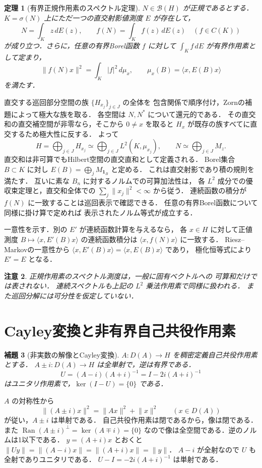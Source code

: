 \documentclass[a5paper,10pt,onecolumn]{jsarticle}
\makeatletter
\theoremstyle{mathnotetheorem}
\newtheorem{theorem}{定理}[section]
\newtheorem{lemma}[theorem]{補題}
\newtheorem{remark}[theorem]{注意}
\renewcommand{\proofname}{証明}
\renewenvironment{proof}[1][\proofname]{%
  \par\pushQED{\qed}\normalfont\topsep4\p@\@plus2\p@\relax
  \trivlist\item[\hskip\labelsep\bfseries #1]\ignorespaces
}{\popQED\endtrivlist\@endpefalse}
\newcommand{\norm}[1]{\lVert #1\rVert}
\makeatother
\begin{document}
\begin{theorem}[有界正規作用素のスペクトル定理]
$N\in\mathcal B(H)$ が正規であるとする．
$K=\sigma(N)$ 上にただ一つの直交射影値測度 $E$ が存在して，
\[
 N=\int_K z\,dE(z),\qquad
 f(N)=\int_K f(z)\,dE(z)\quad(f\in C(K))
\]
が成り立つ．さらに，任意の有界Borel函数 $f$ に対して
$\int_Kf\,dE$ が有界作用素として定まり，
\[
 \norm{f(N)x}^2=\int_K|f|^2\,d\mu_x,
 \qquad \mu_x(B)=\langle x,E(B)x\rangle
\]
を満たす．
\end{theorem}
\begin{proof}
直交する巡回部分空間の族 $\{H_{x_j}\}_{j\in J}$ の全体を
包含関係で順序付け，Zornの補題によって極大な族を取る．
各空間は $N,N^*$ について還元的である．
その直交和の直交補空間が非零なら，そこから $0\ne x$ を取ると
$H_x$ が既存の族すべてに直交するため極大性に反する．
よって
\[
 H=\bigoplus_{j\in J}H_{x_j}
   \simeq\bigoplus_{j\in J}L^2(K,\mu_{x_j}),
 \qquad N\simeq\bigoplus_{j\in J}M_z.
\]
直交和は非可算でもHilbert空間の直交直和として定義される．
Borel集合 $B\subset K$ に対し
$E(B)=\bigoplus_j M_{\mathbf1_B}$ と定める．
これは直交射影であり積の規則を満たす．
互いに素な $B_n$ に対するノルムでの可算加法性は，
各 $L^2$ 成分での優収束定理と，直交和全体での
$\sum_j\norm{x_j}^2<\infty$ から従う．
連続函数の積分が $f(N)$ に一致することは巡回表示で確認できる．
任意の有界Borel函数について同様に掛け算で定めれば
表示されたノルム等式が成立する．

一意性を示す．別の $E'$ が連続函数計算を与えるなら，
各 $x\in H$ に対して正値測度
$B\mapsto\langle x,E'(B)x\rangle$ の連続函数積分は
$\langle x,f(N)x\rangle$ に一致する．
Riesz--Markovの一意性から
$\langle x,E'(B)x\rangle=\langle x,E(B)x\rangle$ であり，
極化恒等式により $E'=E$ となる．
\end{proof}

\begin{remark}
正規作用素のスペクトル測度は，一般に固有ベクトルへの
可算和だけでは表されない．
連続スペクトルも上記の $L^2$ 乗法作用素で同様に扱われる．
また巡回分解には可分性を仮定していない．
\end{remark}

\section{Cayley変換と非有界自己共役作用素}
\begin{lemma}[非実数の解像とCayley変換]
$A:D(A)\to H$ を稠密定義自己共役作用素とする．
$A\pm i:D(A)\to H$ は全単射で，逆は有界である．
\[
 U=(A-i)(A+i)^{-1}=I-2i(A+i)^{-1}
\]
はユニタリ作用素で，$\ker(I-U)=\{0\}$ である．
\end{lemma}
\begin{proof}
$A$ の対称性から
\[
 \norm{(A\pm i)x}^2=\norm{Ax}^2+\norm x^2
 \qquad(x\in D(A))
\]
が従い，$A\pm i$ は単射である．
自己共役作用素は閉であるから，像は閉である．
また
$\operatorname{Ran}(A\pm i)^\perp=\ker(A\mp i)=\{0\}$
なので像は全空間である．逆のノルムは1以下である．
$y=(A+i)x$ とおくと
$\norm{Uy}=\norm{(A-i)x}=\norm{(A+i)x}=\norm y$．
$A-i$ が全射なので $U$ も全射でありユニタリである．
$U-I=-2i(A+i)^{-1}$ は単射である．
\end{proof}
\end{document}
